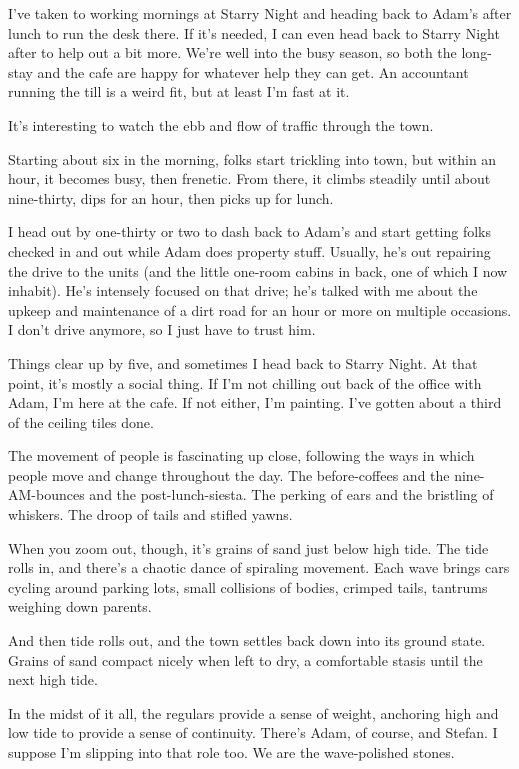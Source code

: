 \secdiv{}

\noindent I've taken to working mornings at Starry Night and heading back to Adam's after lunch to run the desk there. If it's needed, I can even head back to Starry Night after to help out a bit more. We're well into the busy season, so both the long-stay and the cafe are happy for whatever help they can get. An accountant running the till is a weird fit, but at least I'm fast at it.

It's interesting to watch the ebb and flow of traffic through the town.

Starting about six in the morning, folks start trickling into town, but within an hour, it becomes busy, then frenetic. From there, it climbs steadily until about nine-thirty, dips for an hour, then picks up for lunch.

I head out by one-thirty or two to dash back to Adam's and start getting folks checked in and out while Adam does property stuff. Usually, he's out repairing the drive to the units (and the little one-room cabins in back, one of which I now inhabit). He's intensely focused on that drive; he's talked with me about the upkeep and maintenance of a dirt road for an hour or more on multiple occasions. I don't drive anymore, so I just have to trust him.

Things clear up by five, and sometimes I head back to Starry Night. At that point, it's mostly a social thing. If I'm not chilling out back of the office with Adam, I'm here at the cafe. If not either, I'm painting. I've gotten about a third of the ceiling tiles done.

The movement of people is fascinating up close, following the ways in which people move and change throughout the day. The before-coffees and the nine-AM-bounces and the post-lunch-siesta. The perking of ears and the bristling of whiskers. The droop of tails and stifled yawns.

When you zoom out, though, it's grains of sand just below high tide. The tide rolls in, and there's a chaotic dance of spiraling movement. Each wave brings cars cycling around parking lots, small collisions of bodies, crimped tails, tantrums weighing down parents.

And then tide rolls out, and the town settles back down into its ground state. Grains of sand compact nicely when left to dry, a comfortable stasis until the next high tide.

In the midst of it all, the regulars provide a sense of weight, anchoring high and low tide to provide a sense of continuity. There's Adam, of course, and Stefan. I suppose I'm slipping into that role too. We are the wave-polished stones.

